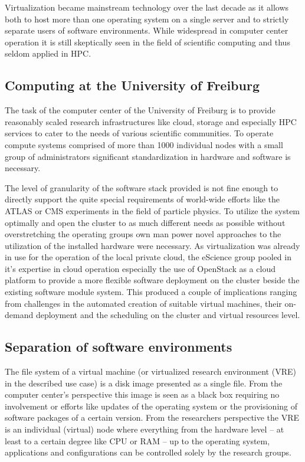 Virtualization became mainstream technology over the last decade as it allows
both to host more than one operating system on a single server and to strictly
separate users of software environments. While widespread in computer center
operation it is still skeptically seen in the field of scientific computing and
thus seldom applied in HPC.

\subsection{Computing at the University of Freiburg}

The task of the computer center of the University of Freiburg is to provide
reasonably scaled research infrastructures like cloud, storage and especially
HPC services to cater to the needs of various scientific communities. To operate
compute systems comprised of more than 1000 individual nodes with a small group
of administrators significant standardization in hardware and software is
necessary.

The level of granularity of the software stack provided is not fine enough to
directly support the quite special requirements of world-wide efforts like the
ATLAS or CMS experiments in the field of particle physics. To utilize the system
optimally and open the cluster to as much different needs as possible without
overstretching the operating groups own man power novel approaches to the
utilization of the installed hardware were necessary. As virtualization was
already in use for the operation of the local private cloud, the eScience group
pooled in it's expertise in cloud operation especially the use of OpenStack as a
cloud platform to provide a more flexible software deployment on the cluster
beside the existing software module system. This produced a couple of
implications ranging from challenges in the automated creation of suitable
virtual machines, their on-demand deployment and the scheduling on the cluster
and virtual resources level.

\subsection{Separation of software environments}

The file system of a virtual machine (or virtualized research environment (VRE)
in the described use case) is a disk image presented as a single file. From the
computer center's perspective this image is seen as a black box requiring no
involvement or efforts like updates of the operating system or the provisioning
of software packages of a certain version. From the researchers perspective the
VRE is an individual (virtual) node where everything from the hardware level --
at least to a certain degree like CPU or RAM -- up to the operating system,
applications and configurations can be controlled solely by the research groups.

